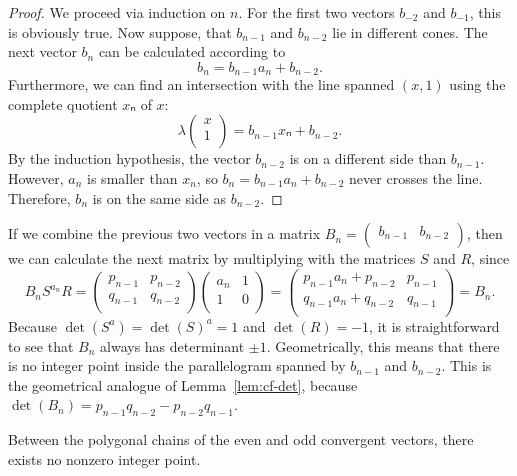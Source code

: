 \begin{proof}
  We proceed via induction on $n$.
  For the first two vectors $b_{-2}$ and $b_{-1}$, this is obviously true.
  Now suppose, that $b_{n-1}$ and $b_{n-2}$ lie in different cones.
  The next vector $b_n$ can be calculated according to
  \[
    b_n = b_{n-1} a_n + b_{n-2}.
  \]
  Furthermore, we can find an intersection with the line spanned $(x, 1)$ using
  the complete quotient $xₙ$ of $x$:
  \[
    λ
    \begin{pmatrix}
      x \\
      1 \\
    \end{pmatrix}
    = b_{n-1} xₙ + b_{n-2}.
  \]
  By the induction hypothesis, the vector $b_{n-2}$ is on a different side than $b_{n-1}$.
  However, $a_n$ is smaller than $x_n$, so $b_n = b_{n-1} a_n + b_{n-2}$ never crosses the line.
  Therefore, $b_n$ is on the same side as $b_{n-2}$.
\end{proof}

If we combine the previous two vectors in a matrix $B_n = \begin{pmatrix}
  b_{n-1} & b_{n-2} \\
\end{pmatrix}$,
then we can calculate the next matrix by multiplying with the matrices $S$ and $R$, since
\[
  B_n S^{a_n} R =
  \begin{pmatrix}
    p_{n-1} & p_{n-2} \\
    q_{n-1} & q_{n-2} \\
  \end{pmatrix}
  \begin{pmatrix}
    a_n & 1 \\
    1   & 0 \\
  \end{pmatrix}
  =
  \begin{pmatrix}
    p_{n-1} a_n + p_{n-2} & p_{n-1} \\
    q_{n-1} a_n + q_{n-2} & q_{n-1} \\
  \end{pmatrix}
  =
  B_n.
\]
Because $\det(S^a) = \det(S)^a = 1$ and $\det(R) = -1$, it is straightforward to
see that $B_n$ always has determinant $±1$.
Geometrically, this means that there is no integer point inside the
parallelogram spanned by $b_{n-1}$ and $b_{n-2}$.
This is the geometrical analogue of Lemma~\ref{lem:cf-det},
because $\det(B_n) = p_{n-1} q_{n-2} - p_{n-2} q_{n-1}$.

\begin{lemma}
  \label{lem:klein-empty}
  Between the polygonal chains of the even and odd convergent vectors,
  there exists no nonzero integer point.
\end{lemma}

